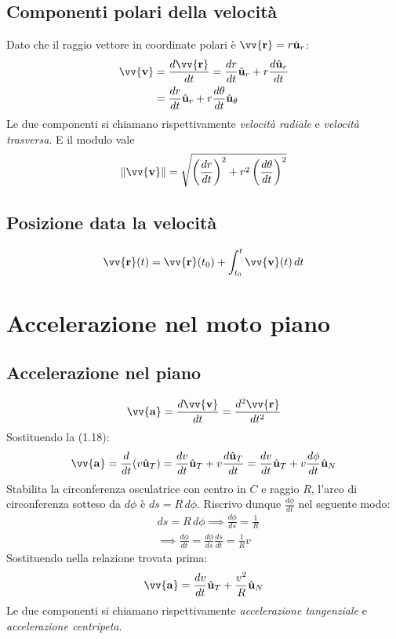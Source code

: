 \documentclass{report}
\newcommand{\versore}[1]{\hat{\mathbf{u}}_{#1}}
\newcommand{\uT}{\versore{T}}
\newcommand{\uN}{\versore{N}}
\newcommand{\ur}{\versore{r}}
\newcommand{\uth}{\versore{\theta}}
\newcommand{\vett}[1]{\vv{\mathbf{#1}}}
\begin{document}
\subsection{Componenti polari della velocità}
Dato che il raggio vettore in coordinate polari è \(\vett{r} = r\ur\):
\begin{align}
    \vett{v} & = \frac{d\vett{r}}{dt} = \frac{dr}{dt}\ur + r\frac{d\ur}{dt} \nonumber \\
    & = \frac{dr}{dt}\ur + r\frac{d\theta}{dt}\uth 
\end{align}
Le due componenti si chiamano rispettivamente \emph{velocità radiale} e \emph{velocità trasversa}.
E il modulo vale
\begin{equation*}
    \norm{\vett{v}} = \sqrt{\left(\frac{dr}{dt}\right)^2 + r^2\left(\frac{d\theta}{dt}\right)^2}
\end{equation*}

\subsection{Posizione data la velocità}
\begin{equation}
    \vett{r}(t) = \vett{r}(t_0) + \int_{t_0}^{t} \vett{v}(t)\,dt 
\end{equation}

\section{Accelerazione nel moto piano}
\subsection{Accelerazione nel piano}
\begin{equation}
    \vett{a} = \frac{d\vett{v}}{dt} = \frac{d^2\vett{r}}{dt^2}
\end{equation}
Sostituendo la (1.18):
\begin{equation*}
    \vett{a} = \frac{d}{dt}(v\uT) = \frac{dv}{dt}\uT + v\frac{d\uT}{dt}
    = \frac{dv}{dt}\uT + v\frac{d\phi}{dt}\uN
\end{equation*}
Stabilita la circonferenza osculatrice con centro in \(C\) e raggio \(R\), 
l'arco di circonferenza sotteso da \(d\phi\) è \(ds = R\,d\phi\). Riscrivo 
dunque \(\frac{d\phi}{dt}\) nel seguente modo:
\begin{align*}
    & ds = R\,d\phi \implies \frac{d\phi}{ds} = \frac{1}{R} \\
    & \implies \frac{d\phi}{dt} = \frac{d\phi}{ds}\frac{ds}{dt} = \frac{1}{R}v
\end{align*}
Sostituendo nella relazione trovata prima:
\begin{equation}
    \vett{a} = \frac{dv}{dt}\uT + \frac{v^2}{R}\uN
\end{equation}
Le due componenti si chiamano rispettivamente \emph{accelerazione tangenziale} e \emph{accelerazione centripeta}.
\end{document}
